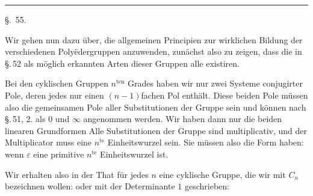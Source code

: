 
\begin{center}

\textbf{}

\rule{3cm}{0.4pt}

\S.\ 55.
\end{center}

\begin{center}
\end{center}

Wir gehen nun dazu über, die allgemeinen Principien zur
wirklichen Bildung der verschiedenen Poly\"edergruppen anzuwenden,
zunächst also zu zeigen, dass die in \S.\,52 als möglich
erkannten Arten dieser Gruppen alle existiren.

Bei den cyklischen Gruppen $n^{\text{ten}}$ Grades haben wir nur zwei
Systeme conjugirter Pole, deren jedes nur einen $(n-1)$fachen
Pol enthält. Diese beiden Pole müssen also die gemeinsamen
Pole aller Substitutionen der Gruppe sein und können nach
\S.\,51, 2. als $0$ und $\infty$ angenommen werden. Wir haben dann
nur die beiden linearen Grundformen
Alle Substitutionen der Gruppe sind multiplicativ, und der
Multiplicator muss eine $n^{\text{te}}$ Einheitswurzel sein. Sie müssen also
die Form haben:
wenn $\varepsilon$ eine primitive $n^{\text{te}}$ Einheitswurzel ist.

Wir erhalten also in der That für jedes $n$ eine cyklische
Gruppe, die wir mit $C_n$ bezeichnen wollen:
oder mit der Determinante $1$ geschrieben:
